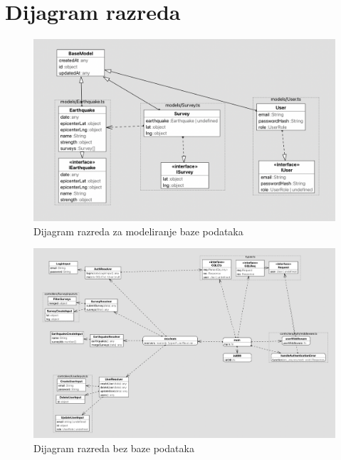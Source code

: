 			\eject
			
			
		\section{Dijagram razreda}
			
			\begin{figure}[H]
				\includegraphics[width=\textwidth]{slike/classdiagram_only_db.png} 
				\caption{Dijagram razreda za modeliranje baze podataka}
				\label{fig:uml_db} 
			\end{figure}

			\begin{figure}[H]
				\includegraphics[width=\textwidth]{slike/classdiagram_no_db.png} 
				\caption{Dijagram razreda bez baze podataka}
				\label{fig:uml_no_db} 
			\end{figure}

